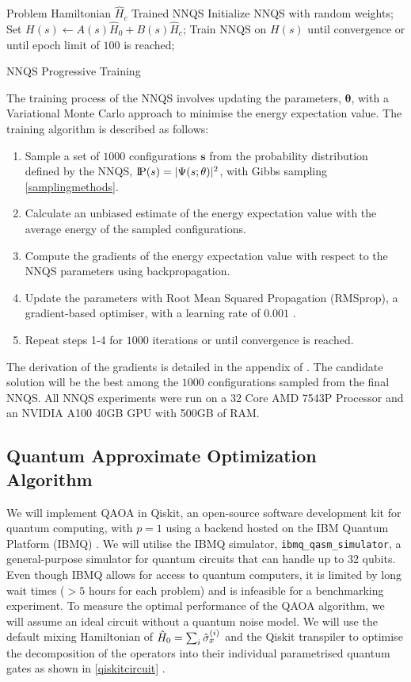 \begin{algorithm}
    \begin{algorithmic}
    \Require Problem Hamiltonian $\hat{H}_c$
    \Ensure Trained NNQS
    \State Initialize NNQS with random weights;
    \State Set $H(s) \leftarrow A(s)\hat{H}_0 + B(s)\hat{H}_c$;
    \State Train NNQS on $H(s)$ until convergence or until epoch limit of $100$ is reached;
    \EndFor
    \end{algorithmic}
    \caption{NNQS Progressive Training}
    \label{alg:progressive}
\end{algorithm}

The training process of the NNQS involves updating the parameters, $\boldsymbol{\theta}$, with a Variational Monte Carlo approach to minimise the energy expectation value. The training algorithm is described as follows:
\begin{enumerate}
    \item Sample a set of $1000$ configurations $\mathbf{s}$ from the probability distribution defined by the NNQS, $\text{I\kern-0.15em P}(s) = |\Psi(s;\theta)|^2$, with Gibbs sampling \autoref{samplingmethods}.
    \item Calculate an unbiased estimate of the energy expectation value with the average energy of the sampled configurations.
    \item Compute the gradients of the energy expectation value with respect to the NNQS parameters using backpropagation.
    \item Update the parameters with Root Mean Squared Propagation (RMSprop), a gradient-based optimiser, with a learning rate of $0.001$ \cite{rmsprop}.
    \item Repeat steps 1-4 for $1000$ iterations or until convergence is reached.
\end{enumerate}
The derivation of the gradients is detailed in the appendix of \cite{b20}. The candidate solution will be the best among the $1000$ configurations sampled from the final NNQS. All NNQS experiments were run on a 32 Core AMD 7543P Processor and an NVIDIA A100 40GB GPU with 500GB of RAM.

\subsection{Quantum Approximate Optimization Algorithm}
We will implement QAOA in Qiskit, an open-source software development kit for quantum computing, with $p=1$ using a backend hosted on the IBM Quantum Platform (IBMQ) \cite{b24}. We will utilise the IBMQ simulator, \texttt{ibmq\_qasm\_simulator}, a general-purpose simulator for quantum circuits that can handle up to 32 qubits. Even though IBMQ allows for access to quantum computers, it is limited by long wait times ($>5$ hours for each problem) and is infeasible for a benchmarking experiment. To measure the optimal performance of the QAOA algorithm, we will assume an ideal circuit without a quantum noise model. We will use the default mixing Hamiltonian of $\Hat{H}_0 = \sum_{i}\Hat{\sigma}_x^{(i)}$ and the Qiskit transpiler to optimise the decomposition of the operators into their individual parametrised quantum gates as shown in \autoref{qiskitcircuit} \cite{qiskittranspiler}.


